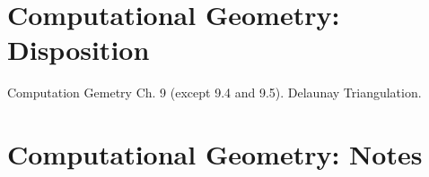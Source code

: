 \section{Computational Geometry: Disposition}

Computation Gemetry Ch. 9 (except 9.4 and 9.5). Delaunay Triangulation.

\section{Computational Geometry: Notes}